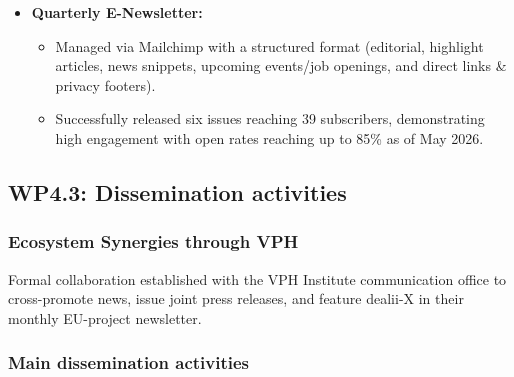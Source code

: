 \documentclass[a4paper,12pt, numbers]{article}
\begin{document}
\begin{itemize}
\item \textbf{Quarterly E-Newsletter:}
\begin{itemize}[left=1em, itemsep=0pt, topsep=0pt]
\item Managed via Mailchimp with a structured format (editorial, highlight articles, news snippets, upcoming events/job openings, and direct links \& privacy footers).
\item Successfully released six issues reaching 39 subscribers, demonstrating high engagement with open rates reaching up to 85\% as of May 2026.
\end{itemize}
\end{itemize}

\subsection{WP4.3: Dissemination activities}


\subsubsection*{Ecosystem Synergies through VPH}

Formal collaboration established with the VPH Institute communication office to cross-promote news, issue joint press releases, and feature dealii-X in their monthly EU-project newsletter.

\subsubsection*{Main dissemination activities}
\end{document}
